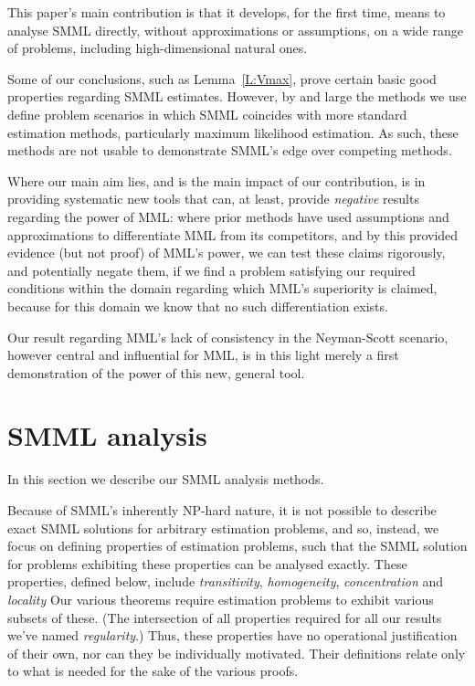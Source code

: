 \documentclass{IEEEtran}
\begin{document}
This paper's main contribution is that it develops, for the first time,
means to analyse SMML directly, without approximations or assumptions, on a
wide range of problems, including high-dimensional natural ones.

Some of our conclusions, such as Lemma~\ref{L:Vmax}, prove certain basic
good properties regarding SMML estimates. However, by and large the methods
we use define problem scenarios in which SMML coincides with more standard
estimation methods, particularly maximum likelihood estimation. As such,
these methods are not usable to demonstrate SMML's edge over competing
methods.

Where our main aim lies, and is the main impact of our contribution, is in
providing systematic new tools that can, at least, provide \emph{negative}
results regarding the power of MML: where prior methods have used assumptions
and approximations to differentiate MML from its competitors, and by this
provided evidence (but not proof) of MML's power, we can test these claims
rigorously, and potentially negate them, if we find a problem satisfying our
required conditions within the domain regarding which MML's superiority
is claimed, because for this domain we know that no such differentiation
exists.

Our result regarding MML's lack of consistency in the Neyman-Scott scenario,
however central and influential for MML, is in this light merely a first
demonstration of the power of this new, general tool.

\section{SMML analysis}\label{S:smml}

In this section we describe our SMML analysis methods.

Because of SMML's inherently NP-hard nature, it is not possible to describe
exact SMML solutions
for arbitrary estimation problems, and so, instead, we focus on defining
properties of estimation problems, such that the SMML solution for problems
exhibiting these properties can be analysed exactly. These properties,
defined below, include \emph{transitivity}, \emph{homogeneity},
\emph{concentration} and \emph{locality}
Our various theorems require estimation problems to exhibit
various subsets of these. (The intersection of all properties required for
all our results we've named \emph{regularity}.)
Thus, these properties have no operational
justification of their own, nor can they be individually motivated. Their
definitions relate only to what is needed for the sake of the various proofs.
\end{document}
